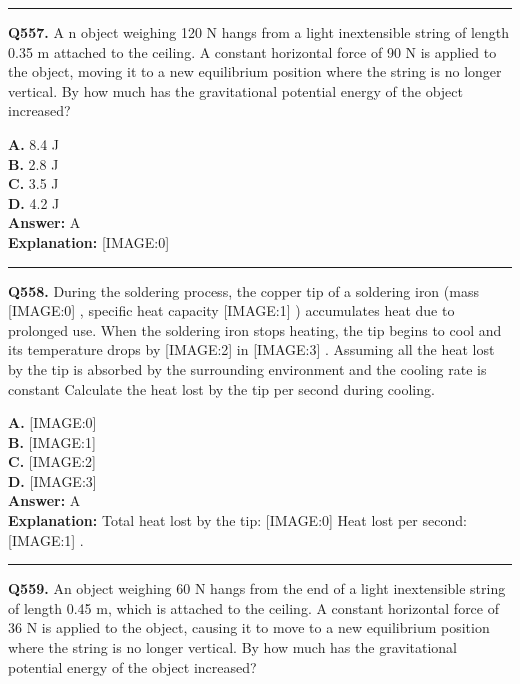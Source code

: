 \documentclass[12pt]{article}
\begin{document}
\hrule
\vspace{1em}


\noindent
\textbf{Q557.} A
n object weighing
120
N hangs from a light inextensible string of length 0.35 m attached to the ceiling. A constant horizontal force of
90
N is applied to the object, moving it to a new equilibrium position where the string is no longer vertical. By how much has the gravitational potential energy of the object increased?



\textbf{A.} 8.4
J \\
\textbf{B.} 2.8 J \\
\textbf{C.} 3.5 J \\
\textbf{D.} 4.2 J \\

\textbf{Answer:} A \\
\textbf{Explanation:} [IMAGE:0]

\hrule
\vspace{1em}


\noindent
\textbf{Q558.} During the soldering process, the copper tip of a soldering iron (mass
[IMAGE:0]
, specific heat capacity
[IMAGE:1]
) accumulates heat due to prolonged use. When the soldering iron stops heating, the tip begins to cool and its temperature drops by
[IMAGE:2]
in
[IMAGE:3]
. Assuming all the heat lost by the tip is absorbed by the surrounding environment and the cooling rate is constant
Calculate the heat lost by the tip per second during cooling.



\textbf{A.} [IMAGE:0] \\
\textbf{B.} [IMAGE:1] \\
\textbf{C.} [IMAGE:2] \\
\textbf{D.} [IMAGE:3] \\

\textbf{Answer:} A \\
\textbf{Explanation:} Total heat lost by the tip:
[IMAGE:0]
Heat lost per second:
[IMAGE:1]
.

\hrule
\vspace{1em}


\noindent
\textbf{Q559.} An object weighing
60
N hangs from the end of a light inextensible string of length 0.45 m, which is attached to the ceiling. A constant horizontal force of
36
N is applied to the object, causing it to move to a new equilibrium position where the string is no longer vertical. By how much has the gravitational potential energy of the object increased?
\end{document}
